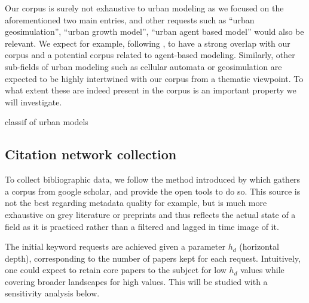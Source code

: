 Our corpus is surely not exhaustive to urban modeling as we focused on the aforementioned two main entries, and other requests such as ``urban geosimulation'', ``urban growth model'', ``urban agent based model'' would also be relevant. We expect for example, following \cite{wise2016transportation}, to have a strong overlap with our corpus and a potential corpus related to agent-based modeling. Similarly, other sub-fields of urban modeling such as cellular automata \cite{white1993cellular} or geosimulation \cite{benenson2004geosimulation} are expected to be highly intertwined with our corpus from a thematic viewpoint. To what extent these are indeed present in the corpus is an important property we will investigate.

classif of urban models \cite{batty2016classifying}

\subsection*{Citation network collection}


To collect bibliographic data, we follow the method introduced by \cite{raimbault2019exploration} which gathers a corpus from google scholar, and provide the open tools to do so. This source is not the best regarding metadata quality for example, but is much more exhaustive on grey literature or preprints and thus reflects the actual state of a field as it is practiced rather than a filtered and lagged in time image of it.


The initial keyword requests are achieved given a parameter $h_d$ (horizontal depth), corresponding to the number of papers kept for each request. Intuitively, one could expect to retain core papers to the subject for low $h_d$ values while covering broader landscapes for high values. This will be studied with a sensitivity analysis below.




